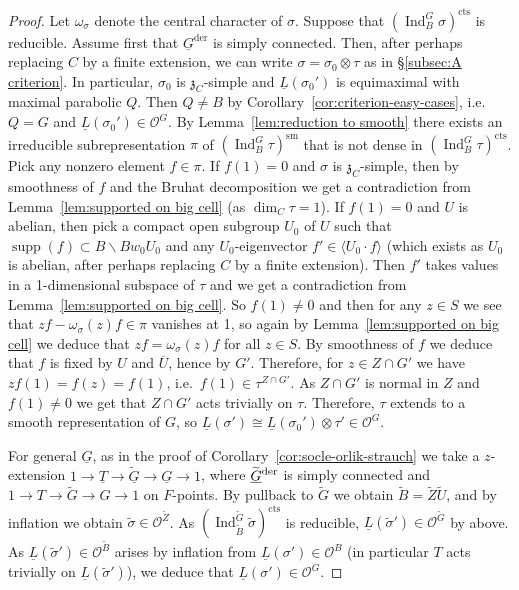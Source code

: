 \documentclass[a4paper]{amsart}
\numberwithin{equation}{section}
\theoremstyle{remark}
\theoremstyle{definition}
\DeclareMathOperator{\Ind}{Ind}
\newcommand{\sm}{\mathrm{sm}}
\DeclareMathOperator{\supp}{supp}
\newcommand{\alggrp}[1]{\underline{#1}}
\newcommand{\der}{\mathrm{der}}
\newcommand{\cts}{\mathrm{cts}}
\newcommand{\ang}[1]{\langle #1\rangle}
\newcommand{\lowprime}[1][\prime]{
  \mathchoice
    {\raisebox{-0.7ex}{$\scriptstyle #1$}}
    {\raisebox{-0.7ex}{$\scriptstyle #1$}}
    {\raisebox{-0.7ex}{$\scriptstyle #1$}}
    {\raisebox{-0.3ex}{$\scriptscriptstyle #1$}}
}
\newcommand{\wt}[1]{\widetilde{#1}}
\begin{document}
\begin{proof}
  Let $\omega_{\sigma}$ denote the central character of $\sigma$.
  Suppose that $(\Ind_{B}^{G}\sigma)^{\cts}$ is reducible.
  Assume first that $\alggrp G^\der$ is simply connected.
  Then, after perhaps replacing $C$ by a finite extension, we can write $\sigma = \sigma_0 \otimes \tau$ as in \S\ref{subsec:A criterion}.
  In particular, $\sigma_0$ is $\mathfrak z_C$-simple and $\underline L(\sigma_0')$ is equimaximal with maximal parabolic $Q$.
  Then $Q \ne B$ by Corollary~\ref{cor:criterion-easy-cases}, i.e.\ $Q = G$ and $\underline L(\sigma_0') \in \mathcal O^G$.
  By Lemma~\ref{lem:reduction to smooth} there exists an irreducible subrepresentation $\pi$ of $(\Ind_{B}^{G}\tau)^{\sm}$ that is not dense in $(\Ind_{B}^{G}\tau)^{\cts}$.
  Pick any nonzero element $f \in \pi$.
  If $f(1) = 0$ and $\sigma$ is $\mathfrak z_C$-simple, then by smoothness of $f$ and the Bruhat decomposition we get a contradiction from Lemma~\ref{lem:supported on big cell} (as $\dim_C \tau = 1$).
  If $f(1) = 0$ and $U$ is abelian, then pick a compact open subgroup $U_0$ of $U$ such that $\supp(f) \subset B \backslash Bw_0 U_0$ and any $U_0$-eigenvector $f' \in \ang{U_0 \cdot f}$ (which exists as $U_0$ is abelian, after perhaps replacing $C$ by a finite extension).
  Then $f'$ takes values in a 1-dimensional subspace of $\tau$ and we get a contradiction from Lemma~\ref{lem:supported on big cell}.
  So $f(1) \ne 0$ and then for any $z \in S$ we see that $zf - \omega_\sigma(z) f \in \pi$ vanishes at 1, so again by Lemma~\ref{lem:supported on big cell} we deduce that $zf = \omega_\sigma(z) f$ for all $z \in S$.
  By smoothness of $f$ we deduce that $f$ is fixed by $U$ and $\overline U$, hence by $G'$.
  Therefore, for $z \in Z \cap G'$ we have $zf(1) = f(z) = f(1)$, i.e.\ $f(1) \in \tau^{Z \cap G'}$.
  As $Z \cap G'$ is normal in $Z$ and $f(1) \ne 0$ we get that $Z\cap G'$ acts trivially on $\tau$.
  Therefore, $\tau$ extends to a smooth representation of $G$, so $\underline L(\sigma') \cong \underline L(\sigma_0') \otimes \tau' \in \mathcal O^G$.

  For general $\alggrp G$, as in the proof of Corollary~\ref{cor:socle-orlik-strauch}
  we take a $z$-extension $1 \to \alggrp T \to \wt {\alggrp G} \to \alggrp G \to 1$, where ${\wt{\alggrp{G}}}^{\lowprime[\der]}$ is simply connected and $1 \to T \to \wt G \to G \to 1$ on $F$-points.
  By pullback to $\wt G$ we obtain $\wt B = \wt Z \wt U$, and by inflation we obtain $\wt \sigma \in \mathcal O^{\wt Z}$.
  As $(\Ind_{\wt B}^{\wt G}\wt\sigma)^{\cts}$ is reducible, $\underline L(\wt\sigma') \in \mathcal O^{\wt G}$ by above.
  As $\underline L(\wt\sigma') \in \mathcal O^{\wt B}$ arises by inflation from $\underline L(\sigma') \in \mathcal O^{B}$ (in particular $T$ acts trivially on $\underline L(\wt\sigma')$), we deduce that $\underline L(\sigma') \in \mathcal O^G$.


\end{proof}
\end{document}
